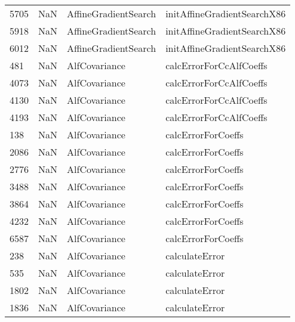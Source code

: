 \begin{tabular}{llll}
5705 &                   NaN &       AffineGradientSearch &               initAffineGradientSearchX86 \\
5918 &                   NaN &       AffineGradientSearch &               initAffineGradientSearchX86 \\
6012 &                   NaN &       AffineGradientSearch &               initAffineGradientSearchX86 \\
481  &                   NaN &              AlfCovariance &                   calcErrorForCcAlfCoeffs \\
4073 &                   NaN &              AlfCovariance &                   calcErrorForCcAlfCoeffs \\
4130 &                   NaN &              AlfCovariance &                   calcErrorForCcAlfCoeffs \\
4193 &                   NaN &              AlfCovariance &                   calcErrorForCcAlfCoeffs \\
138  &                   NaN &              AlfCovariance &                        calcErrorForCoeffs \\
2086 &                   NaN &              AlfCovariance &                        calcErrorForCoeffs \\
2776 &                   NaN &              AlfCovariance &                        calcErrorForCoeffs \\
3488 &                   NaN &              AlfCovariance &                        calcErrorForCoeffs \\
3864 &                   NaN &              AlfCovariance &                        calcErrorForCoeffs \\
4232 &                   NaN &              AlfCovariance &                        calcErrorForCoeffs \\
6587 &                   NaN &              AlfCovariance &                        calcErrorForCoeffs \\
238  &                   NaN &              AlfCovariance &                            calculateError \\
535  &                   NaN &              AlfCovariance &                            calculateError \\
1802 &                   NaN &              AlfCovariance &                            calculateError \\
1836 &                   NaN &              AlfCovariance &                            calculateError \\

\end{tabular}
